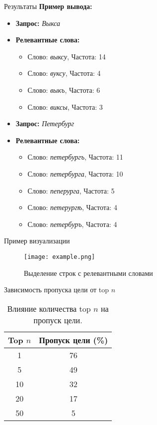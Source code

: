\documentclass{beamer}
\begin{document}
\begin{frame}{Результаты}
    \textbf{Пример вывода:}
    \begin{itemize}
        \item \textbf{Запрос:} \textit{Выкса}
        \item \textbf{Релевантные слова:}
        \begin{itemize}
            \item Слово: \textit{выксу}, Частота: 14
            \item Слово: \textit{вуксу}, Частота: 4
            \item Слово: \textit{выкъ}, Частота: 6
            \item Слово: \textit{виксы}, Частота: 3
        \end{itemize}

    \end{itemize}

    \begin{itemize}
        \item \textbf{Запрос:} \textit{Петербург}
        \item \textbf{Релевантные слова:}
        \begin{itemize}
            \item Слово: \textit{петербургъ}, Частота: 11
            \item Слово: \textit{петербурга}, Частота: 10
            \item Слово: \textit{пеперурга}, Частота: 5
            \item Слово: \textit{петерургѣ}, Частота: 4
            \item Слово: \textit{петербуръ}, Частота: 4
        \end{itemize}

    \end{itemize}
\end{frame}

\begin{frame}{Пример визуализации}
    \begin{figure}
        \centering
        \texttt{[image: example.png]}
        \caption{Выделение строк с релевантными словами}
    \end{figure}
\end{frame}

\begin{frame}{Зависимость пропуска цели от top $n$}
    \begin{table}[h!]
        \centering
        \begin{tabular}{|c|c|}
            \hline
            \textbf{Top $n$} & \textbf{Пропуск цели (\%)} \\
            \hline
            1 & 76 \\
            5 & 49 \\
            10 & 32 \\
            20 & 17 \\
            50 & 5 \\
            \hline
        \end{tabular}
        \caption{Влияние количества top $n$ на пропуск цели.}
    \end{table}
\end{frame}
\end{document}
